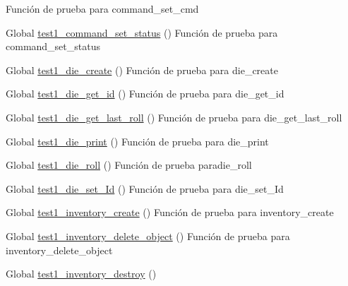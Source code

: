 \begin{DoxyRefList}
%
Función de prueba para command\+\_\+set\+\_\+cmd  
\item[Global \mbox{\hyperlink{command__test_8c_a86c724b0ce8b1a19b138fb1cb5dd84e3}{test1\+\_\+command\+\_\+set\+\_\+status}} ()]\label{test__test000006}%
%
Función de prueba para command\+\_\+set\+\_\+status  
\item[Global \mbox{\hyperlink{die__test_8c_ac0b610468bd3d3b358051c966b771431}{test1\+\_\+die\+\_\+create}} ()]\label{test__test000022}%
%
Función de prueba para die\+\_\+create  
\item[Global \mbox{\hyperlink{die__test_8c_ad27d80a80c4b4fa108337135d5633c90}{test1\+\_\+die\+\_\+get\+\_\+id}} ()]\label{test__test000031}%
%
Función de prueba para die\+\_\+get\+\_\+id  
\item[Global \mbox{\hyperlink{die__test_8c_a99e873ecce6a19186919e991876dadbe}{test1\+\_\+die\+\_\+get\+\_\+last\+\_\+roll}} ()]\label{test__test000029}%
%
Función de prueba para die\+\_\+get\+\_\+last\+\_\+roll  
\item[Global \mbox{\hyperlink{die__test_8c_a4cd7590bbb2edca1414f083ba74ec542}{test1\+\_\+die\+\_\+print}} ()]\label{test__test000033}%
%
Función de prueba para die\+\_\+print  
\item[Global \mbox{\hyperlink{die__test_8c_ac005cb42fa33b38a79896934a5a50001}{test1\+\_\+die\+\_\+roll}} ()]\label{test__test000024}%
%
Función de prueba paradie\+\_\+roll  
\item[Global \mbox{\hyperlink{die__test_8c_aca1dfa20f42a3a4360ac83b32284e11b}{test1\+\_\+die\+\_\+set\+\_\+\+Id}} ()]\label{test__test000026}%
%
Función de prueba para die\+\_\+set\+\_\+\+Id  
\item[Global \mbox{\hyperlink{inventory__test_8c_a33638f1a88ae16ab8d6bee00145b82b8}{test1\+\_\+inventory\+\_\+create}} ()]\label{test__test000036}%
%
Función de prueba para inventory\+\_\+create  
\item[Global \mbox{\hyperlink{inventory__test_8c_af6ad6f6d577b5f123f36351139c6d918}{test1\+\_\+inventory\+\_\+delete\+\_\+object}} ()]\label{test__test000051}%
%
Función de prueba para inventory\+\_\+delete\+\_\+object  
\item[Global \mbox{\hyperlink{inventory__test_8c_ab161eafe6a61db39b2237e97c677d822}{test1\+\_\+inventory\+\_\+destroy}} ()]\label{test__test000038}%

\end{DoxyRefList}
